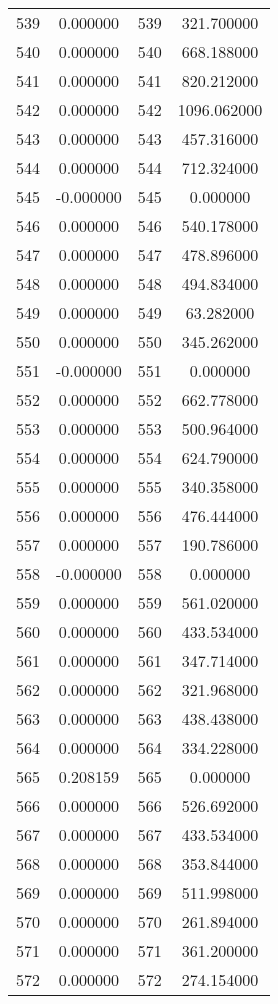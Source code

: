 \documentclass[12pt]{article}
\begin{document}
\begin{longtable}{@{}cccc@{}}
539 & 0.000000 & 539 & 321.700000 \\
540 & 0.000000 & 540 & 668.188000 \\
541 & 0.000000 & 541 & 820.212000 \\
542 & 0.000000 & 542 & 1096.062000 \\
543 & 0.000000 & 543 & 457.316000 \\
544 & 0.000000 & 544 & 712.324000 \\
545 & -0.000000 & 545 & 0.000000 \\
546 & 0.000000 & 546 & 540.178000 \\
547 & 0.000000 & 547 & 478.896000 \\
548 & 0.000000 & 548 & 494.834000 \\
549 & 0.000000 & 549 & 63.282000 \\
550 & 0.000000 & 550 & 345.262000 \\
551 & -0.000000 & 551 & 0.000000 \\
552 & 0.000000 & 552 & 662.778000 \\
553 & 0.000000 & 553 & 500.964000 \\
554 & 0.000000 & 554 & 624.790000 \\
555 & 0.000000 & 555 & 340.358000 \\
556 & 0.000000 & 556 & 476.444000 \\
557 & 0.000000 & 557 & 190.786000 \\
558 & -0.000000 & 558 & 0.000000 \\
559 & 0.000000 & 559 & 561.020000 \\
560 & 0.000000 & 560 & 433.534000 \\
561 & 0.000000 & 561 & 347.714000 \\
562 & 0.000000 & 562 & 321.968000 \\
563 & 0.000000 & 563 & 438.438000 \\
564 & 0.000000 & 564 & 334.228000 \\
565 & 0.208159 & 565 & 0.000000 \\
566 & 0.000000 & 566 & 526.692000 \\
567 & 0.000000 & 567 & 433.534000 \\
568 & 0.000000 & 568 & 353.844000 \\
569 & 0.000000 & 569 & 511.998000 \\
570 & 0.000000 & 570 & 261.894000 \\
571 & 0.000000 & 571 & 361.200000 \\
572 & 0.000000 & 572 & 274.154000 \\

\end{longtable}
\end{document}
